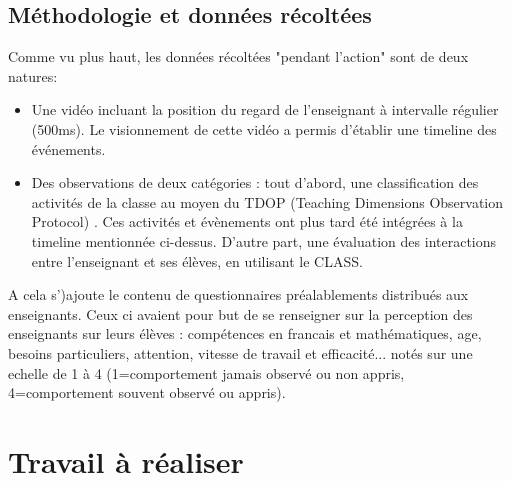 \documentclass{article}
\begin{document}
\subsection{Méthodologie et données récoltées}
Comme vu plus haut, les données récoltées "pendant l'action" sont de deux natures:
\begin{itemize}
  \item Une vidéo incluant la position du regard de l'enseignant à intervalle régulier (500ms). Le visionnement de cette vidéo a permis d'établir une timeline des événements.
  \item Des observations de deux catégories : tout d'abord, une classification des activités de la classe au moyen du TDOP (Teaching Dimensions Observation Protocol) \cite{TDOP}. Ces activités et évènements ont plus tard été intégrées à la timeline mentionnée ci-dessus. D'autre part, une évaluation des interactions entre l'enseignant et ses élèves, en utilisant le CLASS.
\end{itemize}
A cela s')ajoute le contenu de questionnaires préalablements distribués aux enseignants. Ceux ci avaient pour but de se renseigner sur la perception des enseignants sur leurs élèves : compétences en francais et mathématiques, age, besoins particuliers, attention, vitesse de travail et efficacité... notés sur une echelle de 1 à 4 (1=comportement jamais observé ou non appris, 4=comportement souvent observé ou appris).

\section{Travail à réaliser}

{}

\end{document}
